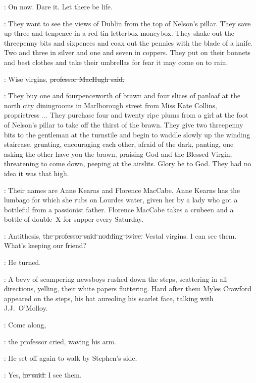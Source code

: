 \StephenInt:
On now.
Dare it.
Let there be life.

\Stephen:
They want to see the views of Dublin from the top of Nelson's pillar.
They save up three and tenpence in a red tin letterbox moneybox.
They shake out the threepenny bits and sixpences
and coax out the pennies with the blade of a knife.
Two and three in silver
and one and seven in coppers.
They put on their bonnets and best clothes
and take their umbrellas for fear it may come on to rain.

\machugh:
Wise virgins,
\sout{professor MacHugh said.}



\Stephen:
They buy one and fourpenceworth of brawn
and four slices of panloaf
at the north city diningrooms in Marlborough street
from Miss Kate Collins, proprietress ...
They purchase four and twenty ripe plums
from a girl at the foot of Nelson's pillar
to take off the thirst of the brawn.
They give two threepenny bits to the gentleman at the turnstile
and begin to waddle slowly up the winding staircase,
grunting,
encouraging each other,
afraid of the dark,
panting,
one asking the other
have you the brawn,
praising
God and the Blessed Virgin,
threatening to come down,
peeping at the airslits.
Glory be to God.
They had no idea it was that high.

\Stephen:
Their names are Anne Kearns and Florence MacCabe.
Anne Kearns has the lumbago for which she rubs on Lourdes water,
given her by a lady
who got a bottleful from a passionist father.
Florence MacCabe takes a crubeen and a bottle of double~X for supper every Saturday.

\machugh:
Antithesis,
\sout{the professor said nodding twice.}
Vestal virgins.
I can see them.
What's keeping our friend?

:
He turned.

:
A bevy of scampering newsboys rushed down the steps,
scattering in all directions, yelling,
their white papers fluttering.
Hard after them Myles Crawford appeared on the steps,
his hat aureoling his scarlet face,
talking with J.J.~O'Molloy.

\machugh:
Come along,

:
the professor cried,
waving his arm.

:
He set off again to walk by Stephen's side.



\machugh:
Yes,
\sout{he said.}
I see them.

